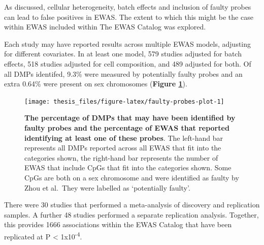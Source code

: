 \documentclass[11pt,oneside]{bristolthesis}
\begin{document}
As discussed, cellular heterogeneity, batch effects and inclusion of faulty probes can lead to false positives in EWAS. The extent to which this might be the case within EWAS included within The EWAS Catalog was explored.

Each study may have reported results across multiple EWAS models, adjusting for different covariates. In at least one model, 579 studies adjusted for batch effects, 518 studies adjusted for cell composition, and 489 adjusted for both. Of all DMPs identifed, 9.3\% were measured by potentially faulty probes and an extra 0.64\% were present on sex chromosomes (\textbf{Figure \ref{fig:faulty-probes-plot}}).




\begin{figure}

{\centering \texttt{[image: thesis\_files/figure-latex/faulty-probes-plot-1]} 

}

\caption[The percentage of DMPs that may have been identified by faulty probes and the percentage of EWAS that reported identifying at least one of these probes]{\textbf{The percentage of DMPs that may have been identified by faulty probes and the percentage of EWAS that reported identifying at least one of these probes}. The left-hand bar represents all DMPs reported across all EWAS that fit into the categories shown, the right-hand bar represents the number of EWAS that include CpGs that fit into the categories shown. Some CpGs are both on a sex chromosome and were identified as faulty by Zhou et al.~They were labelled as `potentially faulty'.}\label{fig:faulty-probes-plot}
\end{figure}
There were 30 studies that performed a meta-analysis of discovery and replication samples. A further 48 studies performed a separate replication analysis. Together, this provides 1666 associations within the EWAS Catalog that have been replicated at P \textless{} 1x10\textsuperscript{-4}.
\end{document}
